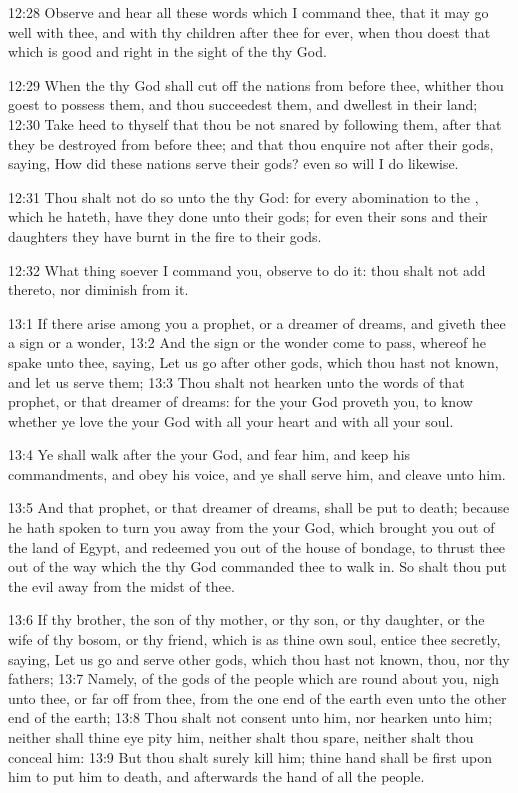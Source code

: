 12:28 Observe and hear all these words which I command thee, that it may go well with thee, and with thy children after thee for ever, when thou doest that which is good and right in the sight of the \LORD thy God.

12:29 When the \LORD thy God shall cut off the nations from before thee, whither thou goest to possess them, and thou succeedest them, and dwellest in their land; 12:30 Take heed to thyself that thou be not snared by following them, after that they be destroyed from before thee; and that thou enquire not after their gods, saying, How did these nations serve their gods? even so will I do likewise.

12:31 Thou shalt not do so unto the \LORD thy God: for every abomination to the \LORD, which he hateth, have they done unto their gods; for even their sons and their daughters they have burnt in the fire to their gods.

12:32 What thing soever I command you, observe to do it: thou shalt not add thereto, nor diminish from it.

13:1 If there arise among you a prophet, or a dreamer of dreams, and giveth thee a sign or a wonder, 13:2 And the sign or the wonder come to pass, whereof he spake unto thee, saying, Let us go after other gods, which thou hast not known, and let us serve them; 13:3 Thou shalt not hearken unto the words of that prophet, or that dreamer of dreams: for the \LORD your God proveth you, to know whether ye love the \LORD your God with all your heart and with all your soul.

13:4 Ye shall walk after the \LORD your God, and fear him, and keep his commandments, and obey his voice, and ye shall serve him, and cleave unto him.

13:5 And that prophet, or that dreamer of dreams, shall be put to death; because he hath spoken to turn you away from the \LORD your God, which brought you out of the land of Egypt, and redeemed you out of the house of bondage, to thrust thee out of the way which the \LORD thy God commanded thee to walk in. So shalt thou put the evil away from the midst of thee.

13:6 If thy brother, the son of thy mother, or thy son, or thy daughter, or the wife of thy bosom, or thy friend, which is as thine own soul, entice thee secretly, saying, Let us go and serve other gods, which thou hast not known, thou, nor thy fathers; 13:7 Namely, of the gods of the people which are round about you, nigh unto thee, or far off from thee, from the one end of the earth even unto the other end of the earth; 13:8 Thou shalt not consent unto him, nor hearken unto him; neither shall thine eye pity him, neither shalt thou spare, neither shalt thou conceal him: 13:9 But thou shalt surely kill him; thine hand shall be first upon him to put him to death, and afterwards the hand of all the people.

